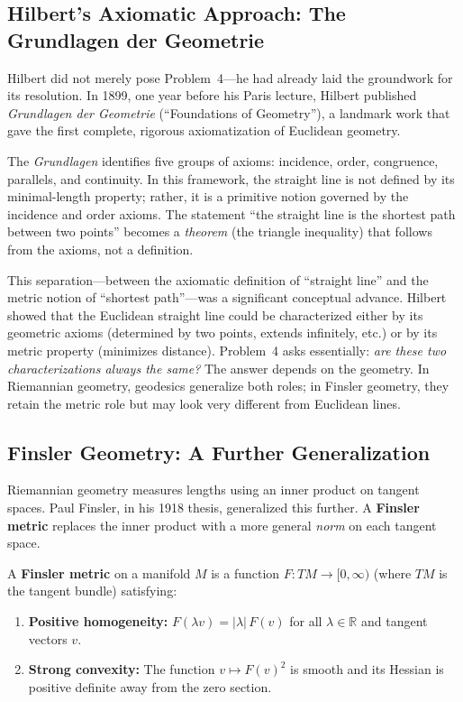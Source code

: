 \subsection{Hilbert's Axiomatic Approach: The Grundlagen der Geometrie}

Hilbert did not merely pose Problem~4---he had already laid the groundwork for its resolution. In 1899, one year before his Paris lecture, Hilbert published \emph{Grundlagen der Geometrie} (``Foundations of Geometry''), a landmark work that gave the first complete, rigorous axiomatization of Euclidean geometry.

The \emph{Grundlagen} identifies five groups of axioms: incidence, order, congruence, parallels, and continuity. In this framework, the straight line is not defined by its minimal-length property; rather, it is a primitive notion governed by the incidence and order axioms. The statement ``the straight line is the shortest path between two points'' becomes a \emph{theorem} (the triangle inequality) that follows from the axioms, not a definition.

This separation---between the axiomatic definition of ``straight line'' and the metric notion of ``shortest path''---was a significant conceptual advance. Hilbert showed that the Euclidean straight line could be characterized either by its geometric axioms (determined by two points, extends infinitely, etc.) or by its metric property (minimizes distance). Problem~4 asks essentially: \emph{are these two characterizations always the same?} The answer depends on the geometry. In Riemannian geometry, geodesics generalize both roles; in Finsler geometry, they retain the metric role but may look very different from Euclidean lines.

\subsection{Finsler Geometry: A Further Generalization}

Riemannian geometry measures lengths using an inner product on tangent spaces. Paul Finsler, in his 1918 thesis, generalized this further. A \textbf{Finsler metric} replaces the inner product with a more general \emph{norm} on each tangent space.

\begin{definition}
A \textbf{Finsler metric} on a manifold $M$ is a function $F : TM \to [0,\infty)$ (where $TM$ is the tangent bundle) satisfying:
\begin{enumerate}
    \item \textbf{Positive homogeneity:} $F(\lambda v) = |\lambda| \, F(v)$ for all $\lambda \in \mathbb{R}$ and tangent vectors $v$.
    \item \textbf{Strong convexity:} The function $v \mapsto F(v)^2$ is smooth and its Hessian is positive definite away from the zero section.
\end{enumerate}
\end{definition}

